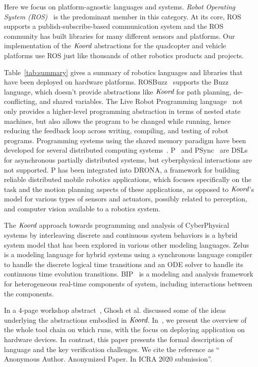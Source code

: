 Here we focus on platform-agnostic languages and systems. {\em Robot Operating System (ROS)\/}~\cite{ros} is the predominant member in this category. At its core, ROS supports a publish-subscribe-based communication system and the ROS community has built libraries for  many  different sensors and platforms.
Our implementation of the $\emph{Koord}$ abstractions for the quadcopter and vehicle platforms use ROS just like thousands of other robotics products and  projects.
 
 Table~\ref{tab:summary} gives a summary of robotics languages and libraries that have been deployed on hardware platforms.
 ROSBuzz~\cite{ROSBuzz} supports the Buzz language, which doesn't provide abstractions like $\emph{Koord}$ for path planning, de-conflicting, and shared variables. The Live Robot Programming language~\cite{campusanofabry:lrp2016} not only provides a higher-level programming abstraction in terms of nested state machines, but also allows the program to be changed while running, hence reducing the feedback loop across writing, compiling, and testing of robot programs. Programming systems using the shared memory paradigm have been developed for several distributed computing systems~\cite{dsm1991,Adve96sharedmemory,Azure,Cassandra,Dynamo}. P~\cite{Planguage}  and PSync~\cite{PSyncLanguage} are DSLs for asynchronous partially distributed systems, but cyberphysical interactions are not supported. P has been integrated into DRONA, a framework for building reliable distributed mobile robotics applications, which focuses specifically on the task and the motion planning aspects of these applications, as opposed to $\emph{Koord}$'s model for various types of sensors and actuators, possibly related to perception, and computer vision available to a robotics system.


The $\emph{Koord}$ approach towards programming and analysis of CyberPhysical systems by interleaving discrete and continuous system behaviors is a hybrid system model that has been explored in various other modeling languages. Zelus~\cite{zelus} is a modeling language for hybrid systems using a synchronous language compiler to handle the discrete logical time transitions and an ODE solver to handle its continuous time evolution transitions. BIP~\cite{bip} is a modeling and analysis framework for heterogeneous real-time components of system, including interactions between the components.
%

In a 4-page workshop abstract~\cite{ghosh_language_2018}, Ghosh et al. discussed some of the ideas underlying the abstractions embodied in $\emph{Koord}$.
In~\cite{ghosh2019cyphyhouse}, we present the overview of the whole tool chain on which \lgname runs,
with the focus on deploying \Task application on hardware devices.
In contrast, this paper presents the formal description of \lgname language and the key verification challenges.
We cite the reference as ``\cite{ghosh2019cyphyhouse} Anonymous Author. Anonymized Paper. In ICRA 2020 submission''.
